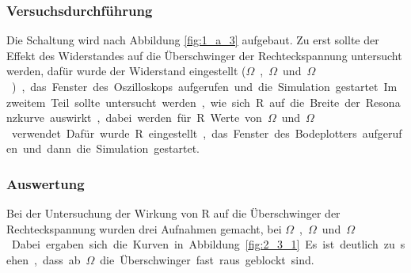 \documentclass[12pt,a4paper]{article}
\begin{document}
\subsubsection{Versuchsdurchführung}

Die Schaltung wird nach Abbildung \ref{fig:1_a_3} aufgebaut. Zu erst sollte der Effekt des Widerstandes auf die Überschwinger der Rechteckspannung untersucht werden, dafür wurde der Widerstand eingestellt (\unit[50]{$\Omega$},\unit[150]{$\Omega$} und \unit[300]{$\Omega$}), das Fenster des Oszilloskops aufgerufen und die Simulation gestartet. Im zweitem Teil sollte untersucht werden, wie sich R auf die Breite der Resonanzkurve auswirkt, dabei werden für R Werte von \unit[25]{$\Omega$} und \unit[50]{$\Omega$} verwendet. Dafür wurde R eingestellt, das Fenster des Bodeplotters aufgerufen und dann die Simulation gestartet.


\subsubsection{Auswertung}

Bei der Untersuchung der Wirkung von R auf die Überschwinger der Rechteckspannung wurden drei Aufnahmen gemacht, bei \unit[50]{$\Omega$}, \unit[150]{$\Omega$} und \unit[300]{$\Omega$}. Dabei ergaben sich die Kurven in Abbildung \ref{fig:2_3_1}. Es ist deutlich zu sehen, dass ab \unit[150]{$\Omega$} die Überschwinger fast raus geblockt sind.
\end{document}
